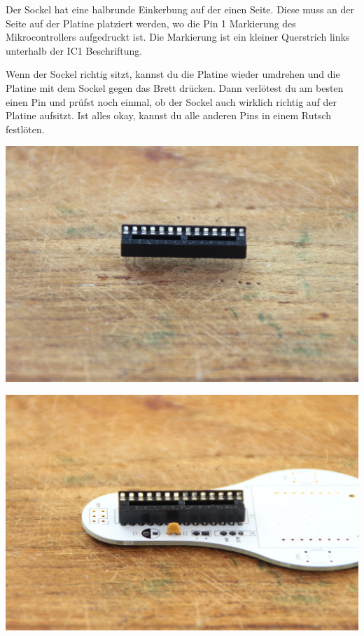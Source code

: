 \documentclass{article}
\begin{document}
Der Sockel hat eine halbrunde Einkerbung auf der einen Seite. Diese muss an der Seite auf der Platine platziert werden, wo die Pin 1 Markierung des Mikrocontrollers aufgedruckt ist. Die Markierung ist ein kleiner Querstrich links unterhalb der IC1 Beschriftung.

Wenn der Sockel richtig sitzt, kannst du die Platine wieder umdrehen und die Platine mit dem Sockel gegen das Brett drücken. Dann verlötest du am besten einen Pin und prüfst noch einmal, ob der Sockel auch wirklich richtig auf der Platine aufsitzt. Ist alles okay, kannst du alle anderen Pins in einem Rutsch festlöten.

\vspace{1cm}

\begin{minipage}[b]{0.5\textwidth}
	\includegraphics[width=\textwidth]{Bilder2023/IMG_8344.JPG}
\end{minipage}
\begin{minipage}[b]{0.5\textwidth}
	\includegraphics[width=\textwidth]{Bilder2023/IMG_8345.JPG}
\end{minipage}
\end{document}
